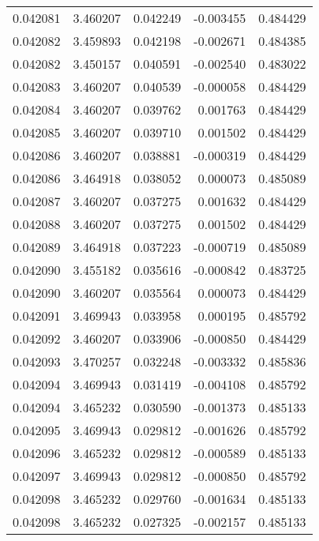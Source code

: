 \begin{tabular}{lrrrr}
0.042081    &  3.460207 &  0.042249 & -0.003455 &             0.484429 \\
0.042082    &  3.459893 &  0.042198 & -0.002671 &             0.484385 \\
0.042082    &  3.450157 &  0.040591 & -0.002540 &             0.483022 \\
0.042083    &  3.460207 &  0.040539 & -0.000058 &             0.484429 \\
0.042084    &  3.460207 &  0.039762 &  0.001763 &             0.484429 \\
0.042085    &  3.460207 &  0.039710 &  0.001502 &             0.484429 \\
0.042086    &  3.460207 &  0.038881 & -0.000319 &             0.484429 \\
0.042086    &  3.464918 &  0.038052 &  0.000073 &             0.485089 \\
0.042087    &  3.460207 &  0.037275 &  0.001632 &             0.484429 \\
0.042088    &  3.460207 &  0.037275 &  0.001502 &             0.484429 \\
0.042089    &  3.464918 &  0.037223 & -0.000719 &             0.485089 \\
0.042090    &  3.455182 &  0.035616 & -0.000842 &             0.483725 \\
0.042090    &  3.460207 &  0.035564 &  0.000073 &             0.484429 \\
0.042091    &  3.469943 &  0.033958 &  0.000195 &             0.485792 \\
0.042092    &  3.460207 &  0.033906 & -0.000850 &             0.484429 \\
0.042093    &  3.470257 &  0.032248 & -0.003332 &             0.485836 \\
0.042094    &  3.469943 &  0.031419 & -0.004108 &             0.485792 \\
0.042094    &  3.465232 &  0.030590 & -0.001373 &             0.485133 \\
0.042095    &  3.469943 &  0.029812 & -0.001626 &             0.485792 \\
0.042096    &  3.465232 &  0.029812 & -0.000589 &             0.485133 \\
0.042097    &  3.469943 &  0.029812 & -0.000850 &             0.485792 \\
0.042098    &  3.465232 &  0.029760 & -0.001634 &             0.485133 \\
0.042098    &  3.465232 &  0.027325 & -0.002157 &             0.485133 \\

\end{tabular}
